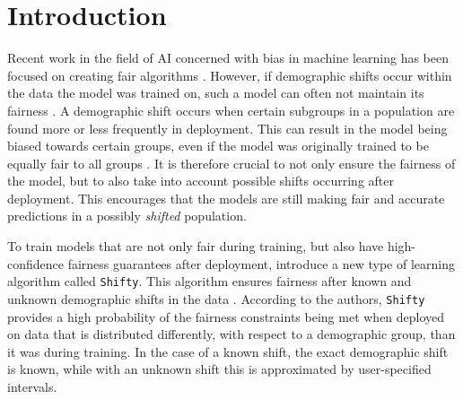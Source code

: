 \section{Introduction}
Recent work in the field of AI concerned with bias in machine learning has been focused on creating fair algorithms \cite{thomas2019preventing, agarwal2018reductions}. However, if demographic shifts occur within the data the model was trained on, such a model can often not maintain its fairness \cite{giguere2022fairness}. A demographic shift occurs when certain subgroups in a population are found more or less frequently in deployment. This can result in the model being biased towards certain groups, even if the model was originally trained to be equally fair to all groups \cite{schrouff2022maintaining}. It is therefore crucial to not only ensure the fairness of the model, but to also take into account possible shifts occurring after deployment. This encourages that the models are still making fair and accurate predictions in a possibly \textit{shifted} population.

To train models that are not only fair during training, but also have high-confidence fairness guarantees after deployment, \citeauthor{giguere2022fairness} introduce a new type of learning algorithm called \texttt{Shifty}. This algorithm ensures fairness after known and unknown demographic shifts in the data \cite{giguere2022fairness}. According to the authors, \texttt{Shifty} provides a high probability of the fairness constraints being met when deployed on data that is distributed differently, with respect to a demographic group, than it was during training. In the case of a known shift, the exact demographic shift is known, while with an unknown shift this is approximated by user-specified intervals. %

